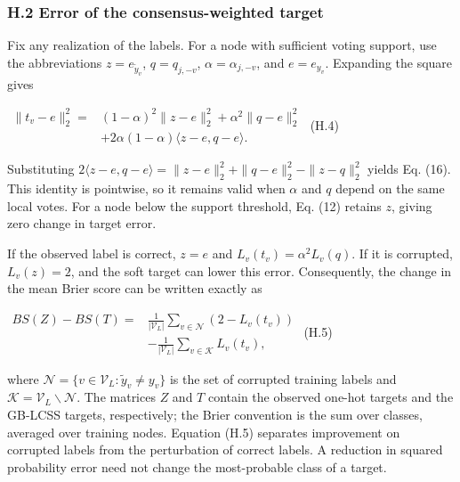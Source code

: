 \subsubsection{H.2 Error of the consensus-weighted target}\label{h.2-error-of-the-consensus-weighted-target}

Fix any realization of the labels. For a node with sufficient voting support, use the abbreviations \(z = e_{{\widetilde{y}}_{v}}\), \(q = q_{j, - v}\), \(\alpha = \alpha_{j, - v}\), and \(e = e_{y_{v}}\). Expanding the square gives

\(\begin{aligned}
 \parallel t_{v} - e \parallel_{2}^{2} = & (1 - \alpha)^{2} \parallel z - e \parallel_{2}^{2} + \alpha^{2} \parallel q - e \parallel_{2}^{2} \\
 & + 2\alpha(1 - \alpha)\langle z - e,q - e\rangle.
\end{aligned}\) (H.4)

Substituting \(2\langle z - e,q - e\rangle = \parallel z - e \parallel_{2}^{2} + \parallel q - e \parallel_{2}^{2} - \parallel z - q \parallel_{2}^{2}\) yields Eq. (16). This identity is pointwise, so it remains valid when \(\alpha\) and \(q\) depend on the same local votes. For a node below the support threshold, Eq. (12) retains \(z\), giving zero change in target error.

If the observed label is correct, \(z = e\) and \(L_{v}(t_{v}) = \alpha^{2}L_{v}(q)\). If it is corrupted, \(L_{v}(z) = 2\), and the soft target can lower this error. Consequently, the change in the mean Brier score can be written exactly as

\(\begin{aligned}
BS(Z) - BS(T) = & \frac{1}{|\mathcal{V}_{L}|}\sum_{v \in \mathcal{N}}^{}\left( 2 - L_{v}(t_{v}) \right) \\
 & - \frac{1}{|\mathcal{V}_{L}|}\sum_{v \in \mathcal{K}}^{}L_{v}(t_{v}),
\end{aligned}\) (H.5)

where \(\mathcal{N} = \{ v \in \mathcal{V}_{L}:{\widetilde{y}}_{v} \neq y_{v}\}\) is the set of corrupted training labels and \(\mathcal{K} = \mathcal{V}_{L}\backslash\mathcal{N}\). The matrices \(Z\) and \(T\) contain the observed one-hot targets and the GB-LCSS targets, respectively; the Brier convention is the sum over classes, averaged over training nodes. Equation (H.5) separates improvement on corrupted labels from the perturbation of correct labels. A reduction in squared probability error need not change the most-probable class of a target.

